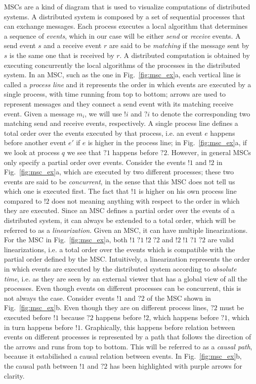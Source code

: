 MSCs are a kind of diagram that is used to visualize computations of distributed systems. A distributed system is composed by a set of sequential processes that can exchange messages. Each process executes a local algorithm that determines a sequence of \emph{events}, which in our case will be either \emph{send} or \emph{receive} events. A send event $s$ and a receive event $r$ are said to be \emph{matching} if the message sent by $s$ is the same one that is received by $r$. A distributed computation is obtained by executing concurrently the local algorithms of the processes in the distributed system. In an MSC, such as the one in Fig.~\ref{fig:msc_ex}a, each vertical line is called a \emph{process line} and it represents the order in which events are executed by a single process, with time running from top to bottom; arrows are used to represent messages and they connect a send event with its matching receive event. Given a message $m_i$, we will use $!i$ and $?i$ to denote the corresponding two matching send and receive events, respectively. A single process line defines a total order over the events executed by that process, i.e. an event $e$ happens before another event $e'$ if $e$ is higher in the process line; in Fig.~\ref{fig:msc_ex}a, if we look at process $q$ we see that $?1$ happens before $?2$. However, in general MSCs only specify a partial order over events. Consider the events $!1$ and $!2$ in Fig.~\ref{fig:msc_ex}a, which are executed by two different processes; these two events are said to be \emph{concurrent}, in the sense that this MSC does not tell us which one is executed first. The fact that $!1$ is higher on his own process line compared to $!2$ does not meaning anything with respect to the order in which they are executed. Since an MSC defines a partial order over the events of a distributed system, it can always be extended to a total order, which will be referred to as a \emph{linearization}. Given an MSC, it can have multiple linearizations. For the MSC in Fig.~\ref{fig:msc_ex}a, both $!1\;?1\;!2\;?2$ and $!2\;!1\;?1\;?2$ are valid linearizations, i.e. a total order over the events which is compatible with the partial order defined by the MSC. Intuitively, a linearization represents the order in which events are executed by the distributed system according to \emph{absolute time}, i.e. as they are seen by an external viewer that has a global view of all the processes. Even though events on different processes can be concurrent, this is not always the case. Consider events $!1$ and $?2$ of the MSC shown in Fig.~\ref{fig:msc_ex}b. Even though they are on different process lines, $?2$ must be executed before $!1$ because $?2$ happens before $!2$, which happens before $?1$, which in turn happens before $!1$. Graphically, this happens before relation between events on different processes is represented by a path that follows the direction of the arrows and runs from top to bottom. This will be referred to as a \emph{causal path}, because it estabilished a causal relation between events. In Fig.~\ref{fig:msc_ex}b, the causal path between $!1$ and $?2$ has been highlighted with purple arrows for clarity.

